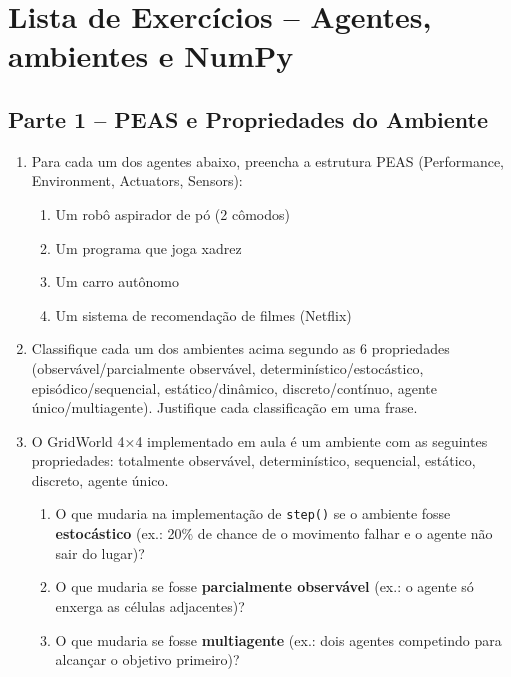 \documentclass[12pt,a4paper]{article}
\begin{document}
\section*{Lista de Exercícios -- Agentes, ambientes e NumPy}

\subsection*{Parte 1 -- PEAS e Propriedades do Ambiente}

\begin{enumerate}[label=\textbf{Q\arabic*.}, leftmargin=*]

\item Para cada um dos agentes abaixo, preencha a estrutura PEAS (Performance, Environment, Actuators, Sensors):

\begin{enumerate}
  \item Um robô aspirador de pó (2 cômodos)
  \item Um programa que joga xadrez
  \item Um carro autônomo
  \item Um sistema de recomendação de filmes (Netflix)
\end{enumerate}

\item Classifique cada um dos ambientes acima segundo as 6 propriedades (observável/parcialmente observável, determinístico/estocástico, episódico/sequencial, estático/dinâmico, discreto/contínuo, agente único/multiagente). Justifique cada classificação em uma frase.

\item O GridWorld 4×4 implementado em aula é um ambiente com as seguintes propriedades: totalmente observável, determinístico, sequencial, estático, discreto, agente único.

\begin{enumerate}
  \item O que mudaria na implementação de \texttt{step()} se o ambiente fosse \textbf{estocástico} (ex.: 20\% de chance de o movimento falhar e o agente não sair do lugar)?
  \item O que mudaria se fosse \textbf{parcialmente observável} (ex.: o agente só enxerga as células adjacentes)?
  \item O que mudaria se fosse \textbf{multiagente} (ex.: dois agentes competindo para alcançar o objetivo primeiro)?
\end{enumerate}


\end{enumerate}
\end{document}
